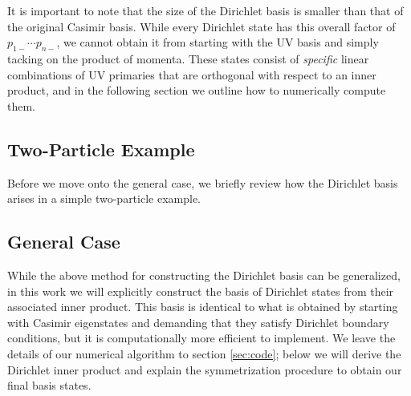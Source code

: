 \begin{subappendices}
It is important to note that the size of the Dirichlet basis is smaller than that of the original Casimir basis. While every Dirichlet state has this overall factor of $p_{1-} \dotsb p_{n-}$, we cannot obtain it from starting with the UV basis and simply tacking on the product of momenta. These states consist of \textit{specific} linear combinations of UV primaries that are orthogonal with respect to an inner product, and in the following section we outline how to numerically compute them.

\subsection{Two-Particle Example} Before we move onto the general case, we briefly review how the Dirichlet basis arises in a simple two-particle example.

\subsection{General Case} While the above method for constructing the Dirichlet basis can be generalized, in this work we will explicitly construct the basis of Dirichlet states from their associated inner product. This basis is identical to what is obtained by starting with Casimir eigenstates and demanding that they satisfy Dirichlet boundary conditions, but it is computationally more efficient to implement. We leave the details of our numerical algorithm to section \ref{sec:code}; below we will derive the Dirichlet inner product and explain the symmetrization procedure to obtain our final basis states.


\end{subappendices}
